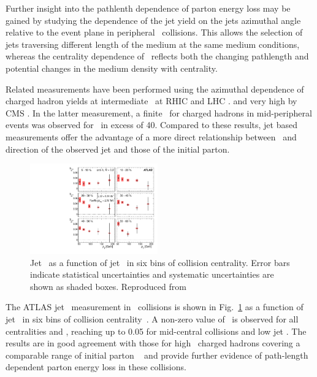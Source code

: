 Further insight into the pathlenth dependence of parton energy
loss may be gained by studying the dependence of the jet yield
on the jets azimuthal angle relative to the event plane
in peripheral \PbPb\ collisions. This allows the selection of jets
traversing different length of the medium at the same medium
conditions, whereas the centrality dependence of \Rcp\ reflects
both the changing pathlength and potential changes in the medium
density with centrality.

Related measurements have been performed using the azimuthal dependence
of charged hadron yields at intermediate \pT\ at RHIC and LHC
\cite{Adams:2004wz,Adler:2006bw,Adare:2010sp, ATLAS:2011ah, Abelev:2012di}.
and very high \pT by CMS \cite{Chatrchyan:2012xq}. In the latter 
measurement, a finite \vtwo\ for charged hadrons in mid-peripheral 
events was observed for \pT\ in excess of 40\GeVc.
Compared to these results, jet based measurements offer the advantage
of a more direct relationship between \pT\ and direction of the observed
jet and those of the initial parton.

\begin{figure}[!th]
\begin{center}
\includegraphics[width=0.49\textwidth]{jetfigures/ATLAS_jetv2.pdf}
\caption{Jet \vtwo\ as a function of jet \pT\ in six bins of 
collision centrality.
Error bars indicate statistical uncertainties and 
systematic uncertainties are shown as shaded boxes. Reproduced from~\cite{Aad:2013sla}}
\label{fig:GR:ATLAS_jet_v2}
\end{center}
\end{figure}

The ATLAS jet \vtwo\ measurement in \PbPb\ collisions 
is shown in Fig.~\ref{fig:GR:ATLAS_jet_v2} as a function of jet \pT\ 
in six bins of collision centrality~\cite{Aad:2013sla}. A non-zero
value of \vtwo\ is observed for all centralities and \pT, reaching up to 0.05 for
mid-central collisions and low jet \pT. The results are in good agreement
with those for high \pT\ charged hadrons covering a comparable range
of initial parton \pT~\cite{Chatrchyan:2012xq} and provide further 
evidence of path-length dependent parton energy loss in these collisions.

